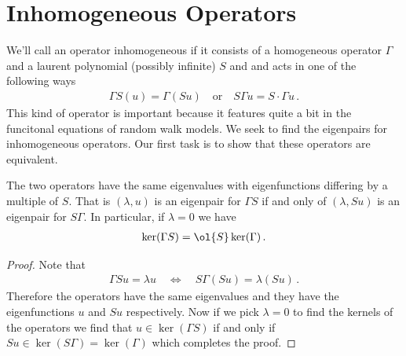 \section{Inhomogeneous Operators}
 We'll call an operator inhomogeneous if it consists of a homogeneous operator $\Gamma$ and a laurent polynomial (possibly infinite) $S$ and and acts in one of the following ways
 \begin{align}
	\Gamma S(u) = \Gamma(Su)\quad\text{or}\quad S\Gamma u = S\cdot \Gamma u\,.
 \end{align}
This kind of operator is important because it features quite a bit in the funcitonal equations of random walk models. We seek to find the eigenpairs for  inhomogeneous operators. Our first task is to show that these operators are equivalent.
\begin{prop} The two operators have the same eigenvalues with eigenfunctions differing by a multiple of $S$. That is $(\lambda,u)$ is an eigenpair for $\Gamma S$ if and only of $(\lambda, Su)$ is an eigenpair for $S \Gamma$. In particular, if $\lambda = 0$ we have
\begin{align}
	\ker(\Gamma S) = \ol{S} \ker(\Gamma)\,.
\end{align}
\end{prop}
\begin{proof} Note that
\begin{align}
	\Gamma Su = \lambda u \quad \Longleftrightarrow \quad S\Gamma (Su) = \lambda (Su)\,.
\end{align}
Therefore the operators have the same eigenvalues and they have the eigenfunctions $u$ and $Su$ respectively. Now if we pick $\lambda = 0$ to find the kernels of the operators we find that $u \in \ker(\Gamma S)$ if and only if $Su \in \ker(S\Gamma) = \ker(\Gamma)$ which completes the proof.
\end{proof}

